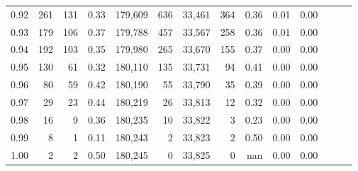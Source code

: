 \begin{tabular}{rrrrrrrrrrrrrr}
0.92 &    261 &  131 &  0.33 &  179,609 &      636 &  33,461 &     364 &  0.36 &  0.01 &      0.00 \\
0.93 &    179 &  106 &  0.37 &  179,788 &      457 &  33,567 &     258 &  0.36 &  0.01 &      0.00 \\
0.94 &    192 &  103 &  0.35 &  179,980 &      265 &  33,670 &     155 &  0.37 &  0.00 &      0.00 \\
0.95 &    130 &   61 &  0.32 &  180,110 &      135 &  33,731 &      94 &  0.41 &  0.00 &      0.00 \\
0.96 &     80 &   59 &  0.42 &  180,190 &       55 &  33,790 &      35 &  0.39 &  0.00 &      0.00 \\
0.97 &     29 &   23 &  0.44 &  180,219 &       26 &  33,813 &      12 &  0.32 &  0.00 &      0.00 \\
0.98 &     16 &    9 &  0.36 &  180,235 &       10 &  33,822 &       3 &  0.23 &  0.00 &      0.00 \\
0.99 &      8 &    1 &  0.11 &  180,243 &        2 &  33,823 &       2 &  0.50 &  0.00 &      0.00 \\
1.00 &      2 &    2 &  0.50 &  180,245 &        0 &  33,825 &       0 &   nan &  0.00 &      0.00 \\
\bottomrule
\end{tabular}
